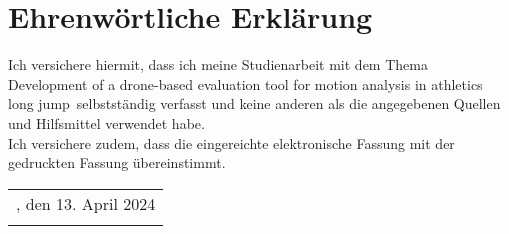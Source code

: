 \chapter*{Ehrenwörtliche Erklärung}
\thispagestyle{empty}

\vspace{5cm}
Ich versichere hiermit, dass ich meine Studienarbeit mit dem Thema
\glqq Development of a drone-based evaluation tool for motion analysis in
athletics long jump\grqq\ selbstständig verfasst und keine anderen als die
angegebenen Quellen und Hilfsmittel verwendet habe. \\
Ich versichere zudem, dass die eingereichte elektronische Fassung mit der
gedruckten Fassung übereinstimmt.

\vfill
\begin{tabular}{l}
	\hline
	\dhstandort, den 13. April 2024\\
	\autor
\end{tabular}

